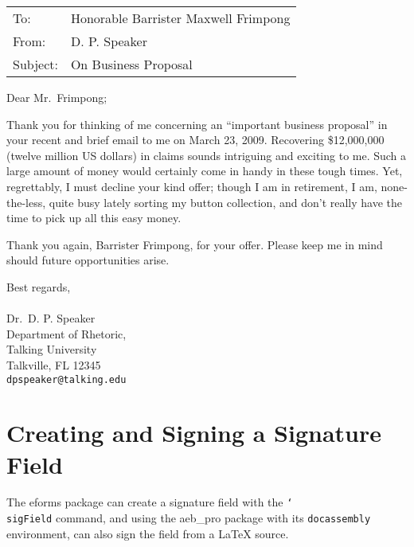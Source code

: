 \documentclass[12pt]{article}
\newcommand{\cs}[1]{\texttt{\char`\\#1}}
\begin{document}

\hfill\smash{\raisebox{-\baselineskip}{March 23, 2009}}

\begin{tabular}{@{}ll}
To:         &Honorable Barrister Maxwell Frimpong\\
From:       &D. P. Speaker\\
Subject:    &On Business Proposal\\
\end{tabular}

\vspace{2\baselineskip}

Dear Mr.\ Frimpong;

Thank you for thinking of me concerning an ``important business proposal'' in
your recent and brief email to me on March 23, 2009. Recovering \$12,000,000
(twelve million US dollars) in claims sounds intriguing and exciting to me.
Such a large amount of money would certainly come in handy in these tough
times. Yet, regrettably, I must decline your kind offer; though I am in
retirement, I am, none-the-less, quite busy lately sorting my button
collection, and don't really have the time to pick up all this easy money.

Thank you again, Barrister Frimpong, for your offer. Please keep me
in mind should future opportunities arise.


\vspace{2\baselineskip}

Best regards,\\
\\[3pt]
Dr.\ D. P. Speaker\\
Department of Rhetoric,\\
Talking University\\
Talkville, FL 12345\\
\texttt{dpspeaker@talking.edu}


\newpage

\section{Creating and Signing a Signature Field}

The \textsf{eforms} package can create a signature field with the \cs{sigField} command, and
using the \textsf{aeb\_pro} package with its \texttt{docassembly} environment, can also sign the field
from a {\LaTeX} source.
\end{document}
